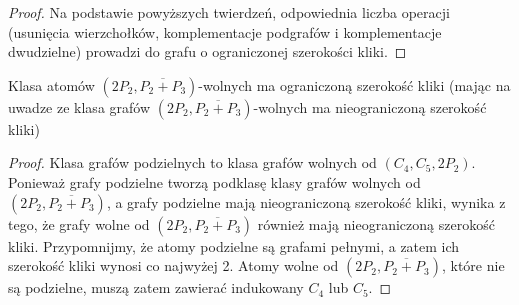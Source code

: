 \documentclass[polish]{beamer}
\begin{document}
\begin{frame}
    \begin{proof}     
        Na podstawie powyższych twierdzeń, odpowiednia liczba operacji (usunięcia wierzchołków, komplementacje podgrafów i komplementacje dwudzielne) prowadzi do grafu o ograniczonej szerokości kliki.
        \end{proof}
\end{frame}

\begin{frame}
    \begin{theorem}
        Klasa atomów $(2P_2, \overline{P_2 + P_3})$-wolnych ma ograniczoną szerokość kliki (mając na uwadze ze klasa grafów $(2P_2, \overline{P_2 + P_3})$-wolnych ma nieograniczoną szerokość kliki)
    \end{theorem}
    \begin{proof}
        Klasa grafów podzielnych to klasa grafów wolnych od $(C_4, C_5, 2P_2)$. Ponieważ grafy podzielne tworzą podklasę klasy grafów wolnych od $(2P_2, \overline{P_2 + P_3})$, a grafy podzielne mają nieograniczoną szerokość kliki, wynika z tego, że grafy wolne od $(2P_2, \overline{P_2 + P_3})$ również mają nieograniczoną szerokość kliki. Przypomnijmy, że atomy podzielne są grafami pełnymi, a zatem ich szerokość kliki wynosi co najwyżej 2. Atomy wolne od $(2P_2, \overline{P_2 + P_3})$, które nie są podzielne, muszą zatem zawierać indukowany $C_4$ lub $C_5$.
    \end{proof}
\end{frame}
\end{document}
